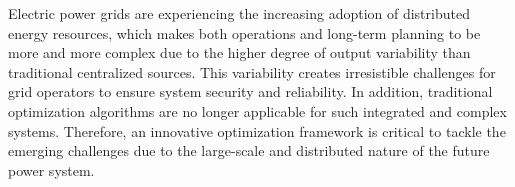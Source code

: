 \documentclass[11pt,ECE_Dissertation_Style]{report}
\numberwithin{algorithm}{chapter}
\begin{document}

 
 
  
 

Electric power grids are experiencing the increasing adoption of distributed energy resources, which makes both operations and long-term planning to be more and more complex due to the higher degree of output variability than traditional centralized sources. This variability creates irresistible challenges for grid operators to ensure system security and reliability. In addition, traditional optimization algorithms are no longer applicable for such integrated and complex systems. Therefore, an innovative optimization framework is critical to tackle the emerging challenges due to the large-scale and distributed nature of the future power system.
\end{document}

